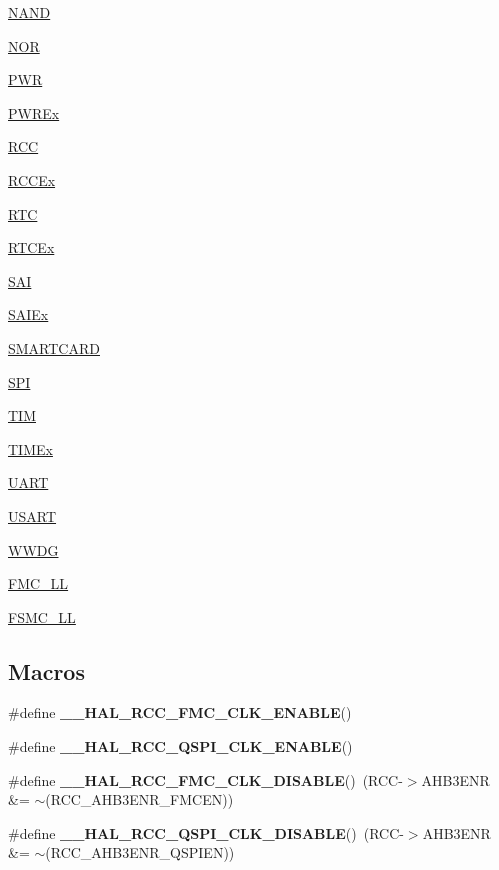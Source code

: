 \begin{DoxyCompactItemize}
\item 
\hyperlink{group___n_a_n_d}{N\+A\+ND}
\item 
\hyperlink{group___n_o_r}{N\+OR}
\item 
\hyperlink{group___p_w_r}{P\+WR}
\item 
\hyperlink{group___p_w_r_ex}{P\+W\+R\+Ex}
\item 
\hyperlink{group___r_c_c}{R\+CC}
\item 
\hyperlink{group___r_c_c_ex}{R\+C\+C\+Ex}
\item 
\hyperlink{group___r_t_c}{R\+TC}
\item 
\hyperlink{group___r_t_c_ex}{R\+T\+C\+Ex}
\item 
\hyperlink{group___s_a_i}{S\+AI}
\item 
\hyperlink{group___s_a_i_ex}{S\+A\+I\+Ex}
\item 
\hyperlink{group___s_m_a_r_t_c_a_r_d}{S\+M\+A\+R\+T\+C\+A\+RD}
\item 
\hyperlink{group___s_p_i}{S\+PI}
\item 
\hyperlink{group___t_i_m}{T\+IM}
\item 
\hyperlink{group___t_i_m_ex}{T\+I\+M\+Ex}
\item 
\hyperlink{group___u_a_r_t}{U\+A\+RT}
\item 
\hyperlink{group___u_s_a_r_t}{U\+S\+A\+RT}
\item 
\hyperlink{group___w_w_d_g}{W\+W\+DG}
\item 
\hyperlink{group___f_m_c___l_l}{F\+M\+C\+\_\+\+LL}
\item 
\hyperlink{group___f_s_m_c___l_l}{F\+S\+M\+C\+\_\+\+LL}
\end{DoxyCompactItemize}
\subsection*{Macros}
\begin{DoxyCompactItemize}
\item 
\#define {\bfseries \+\_\+\+\_\+\+H\+A\+L\+\_\+\+R\+C\+C\+\_\+\+F\+M\+C\+\_\+\+C\+L\+K\+\_\+\+E\+N\+A\+B\+LE}()
\item 
\#define {\bfseries \+\_\+\+\_\+\+H\+A\+L\+\_\+\+R\+C\+C\+\_\+\+Q\+S\+P\+I\+\_\+\+C\+L\+K\+\_\+\+E\+N\+A\+B\+LE}()
\item 
\#define {\bfseries \+\_\+\+\_\+\+H\+A\+L\+\_\+\+R\+C\+C\+\_\+\+F\+M\+C\+\_\+\+C\+L\+K\+\_\+\+D\+I\+S\+A\+B\+LE}()~(R\+CC-\/$>$A\+H\+B3\+E\+NR \&= $\sim$(R\+C\+C\+\_\+\+A\+H\+B3\+E\+N\+R\+\_\+\+F\+M\+C\+EN))\hypertarget{group___s_t_m32_f4xx___h_a_l___driver_ga96dffcf5a982b89e776d0011e2904c28}{}\label{group___s_t_m32_f4xx___h_a_l___driver_ga96dffcf5a982b89e776d0011e2904c28}

\item 
\#define {\bfseries \+\_\+\+\_\+\+H\+A\+L\+\_\+\+R\+C\+C\+\_\+\+Q\+S\+P\+I\+\_\+\+C\+L\+K\+\_\+\+D\+I\+S\+A\+B\+LE}()~(R\+CC-\/$>$A\+H\+B3\+E\+NR \&= $\sim$(R\+C\+C\+\_\+\+A\+H\+B3\+E\+N\+R\+\_\+\+Q\+S\+P\+I\+EN))\hypertarget{group___s_t_m32_f4xx___h_a_l___driver_gabea7af5741c00891980da84022e945c0}{}\label{group___s_t_m32_f4xx___h_a_l___driver_gabea7af5741c00891980da84022e945c0}

\end{DoxyCompactItemize}


